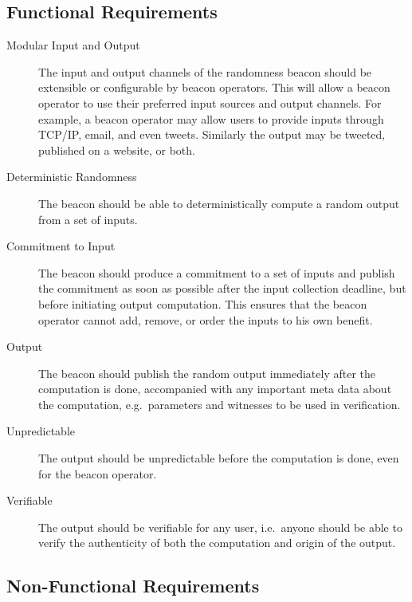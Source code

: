 \subsection{Functional Requirements}
\label{sub:functional_requirements}
\begin{description}
    \item[Modular Input and Output] The input and output channels of the randomness beacon should be extensible or configurable by beacon operators. This will allow a beacon operator to use their preferred input sources and output channels. For example, a beacon operator may allow users to provide inputs through TCP/IP, email, and even tweets. Similarly the output may be tweeted, published on a website, or both.

    \item[Deterministic Randomness] The beacon should be able to deterministically compute a random output from a set of inputs.

    \item[Commitment to Input] The beacon should produce a commitment to a set of inputs and publish the commitment as soon as possible after the input collection deadline, but before initiating output computation. This ensures that the beacon operator cannot add, remove, or order the inputs to his own benefit. 

    \item[Output] The beacon should publish the random output immediately after the computation is done, accompanied with any important meta data about the computation, e.g.\ parameters and witnesses to be used in verification.

    \item[Unpredictable] The output should be unpredictable before the computation is done, even for the beacon operator.

    \item[Verifiable] The output should be verifiable for any user, i.e.\ anyone should be able to verify the authenticity of both the computation and origin of the output.
\end{description}

\subsection{Non-Functional Requirements}
\label{sub:non_functional_requirements}


